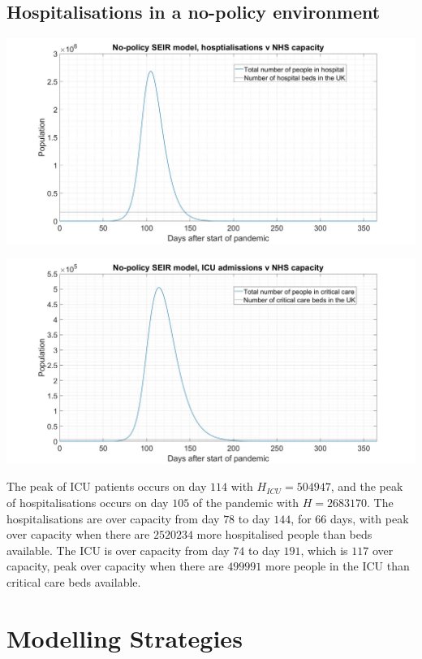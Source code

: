 \documentclass[11pt]{article}
\begin{document}
\subsection{Hospitalisations in a no-policy environment}
\begin{center}
\includegraphics[width=1\textwidth]{No-policyH.jpg} 
\end{center}
\begin{center}
\includegraphics[width=1\textwidth]{No-policyHICU.jpg} 
\end{center}
The peak of ICU patients occurs on day $114$ with $H_{ICU}=504947$, and the peak of hospitalisations occurs on day $105$ of the pandemic with $H=2683170$. The hospitalisations are over capacity from day $78$ to day $144$, for $66$ days, with peak over capacity when there are $2520234$ more hospitalised people than beds available. The ICU is over capacity from day $74$ to day $191$, which is $117$ over capacity, peak over capacity when there are $499991$ more people in the ICU than critical care beds available.
\section{Modelling Strategies}
\end{document}
